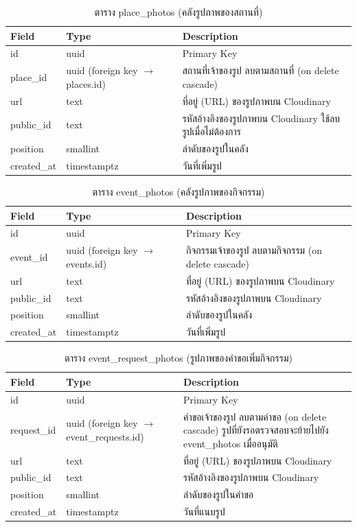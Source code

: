 \begin{table}[H]
\centering
\caption{ตาราง place\_photos (คลังรูปภาพของสถานที่)}
\label{tab:db_pphotos}
\begin{tabular}{|p{3.6cm}|p{2.6cm}|p{6.8cm}|}
\hline
\textbf{Field} & \textbf{Type} & \textbf{Description} \\
\hline
id & uuid & Primary Key \\ \hline
place\_id & uuid (foreign key $\to$ places.id) & สถานที่เจ้าของรูป ลบตามสถานที่ (on delete cascade) \\ \hline
url & text & ที่อยู่ (URL) ของรูปภาพบน Cloudinary \\ \hline
public\_id & text & รหัสอ้างอิงของรูปภาพบน Cloudinary ใช้ลบรูปเมื่อไม่ต้องการ \\ \hline
position & smallint & ลำดับของรูปในคลัง \\ \hline
created\_at & timestamptz & วันที่เพิ่มรูป \\
\hline
\end{tabular}
\end{table}

\begin{table}[H]
\centering
\caption{ตาราง event\_photos (คลังรูปภาพของกิจกรรม)}
\label{tab:db_ephotos}
\begin{tabular}{|p{3.6cm}|p{2.6cm}|p{6.8cm}|}
\hline
\textbf{Field} & \textbf{Type} & \textbf{Description} \\
\hline
id & uuid & Primary Key \\ \hline
event\_id & uuid (foreign key $\to$ events.id) & กิจกรรมเจ้าของรูป ลบตามกิจกรรม (on delete cascade) \\ \hline
url & text & ที่อยู่ (URL) ของรูปภาพบน Cloudinary \\ \hline
public\_id & text & รหัสอ้างอิงของรูปภาพบน Cloudinary \\ \hline
position & smallint & ลำดับของรูปในคลัง \\ \hline
created\_at & timestamptz & วันที่เพิ่มรูป \\
\hline
\end{tabular}
\end{table}

\begin{table}[H]
\centering
\caption{ตาราง event\_request\_photos (รูปภาพของคำขอเพิ่มกิจกรรม)}
\label{tab:db_erphotos}
\begin{tabular}{|p{3.6cm}|p{2.6cm}|p{6.8cm}|}
\hline
\textbf{Field} & \textbf{Type} & \textbf{Description} \\
\hline
id & uuid & Primary Key \\ \hline
request\_id & uuid (foreign key $\to$ event\_requests.id) & คำขอเจ้าของรูป ลบตามคำขอ (on delete cascade) รูปที่ยังรอตรวจสอบจะย้ายไปยัง event\_photos เมื่ออนุมัติ \\ \hline
url & text & ที่อยู่ (URL) ของรูปภาพบน Cloudinary \\ \hline
public\_id & text & รหัสอ้างอิงของรูปภาพบน Cloudinary \\ \hline
position & smallint & ลำดับของรูปในคำขอ \\ \hline
created\_at & timestamptz & วันที่แนบรูป \\
\hline
\end{tabular}
\end{table}

